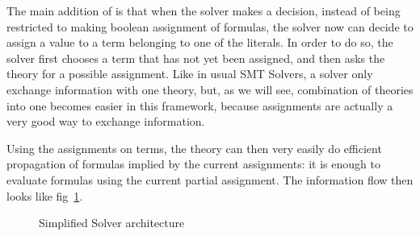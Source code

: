 \documentclass{article}
\begin{document}
The main addition of \mcsat{} is that when the solver makes a decision, instead of
being restricted to making boolean assignment of formulas, the solver now can
decide to assign a value to a term belonging to one of the literals. In order to do so,
the solver first chooses a term that has not yet been assigned, and then asks
the theory for a possible assignment. Like in usual SMT Solvers, a \mcsat{} solver
only exchange information with one theory, but, as we will see, combination
of theories into one becomes easier in this framework, because assignments are
actually a very good way to exchange information.

Using the assignments on terms, the theory can then very easily do efficient
propagation of formulas implied by the current assignments: it is enough to
evaluate formulas using the current partial assignment.
The information flow then looks like fig~\ref{fig:mcsat_flow}.

\begin{figure}
  \begin{center}
  \end{center}
  \caption{Simplified \mcsat{} Solver architecture}\label{fig:mcsat_flow}
\end{figure}
\end{document}
